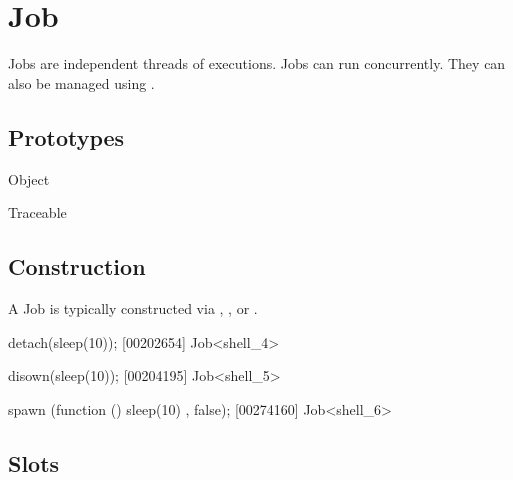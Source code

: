 
\section{Job}

Jobs are independent threads of executions.  Jobs can run concurrently.
They can also be managed using .

\subsection{Prototypes}

\begin{refObjects}
\item[Object]
\item[Traceable]
\end{refObjects}

\subsection{Construction}

A Job is typically constructed via ,
, or .

\begin{urbiscript}
detach(sleep(10));
[00202654] Job<shell_4>

disown(sleep(10));
[00204195] Job<shell_5>

spawn (function () { sleep(10) }, false);
[00274160] Job<shell_6>
\end{urbiscript}

\subsection{Slots}

